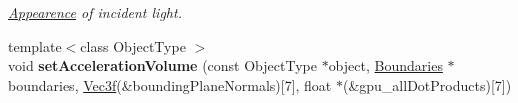 \begin{DoxyCompactItemize}
\begin{DoxyCompactList}\small\item\em \hyperlink{struct_appearence}{Appearence} of incident light. \end{DoxyCompactList}\item 
{\footnotesize template$<$class Object\+Type $>$ }\\void {\bfseries set\+Acceleration\+Volume} (const Object\+Type $\ast$object, \hyperlink{class_boundaries}{Boundaries} $\ast$boundaries, \hyperlink{class_vec3}{Vec3f}(\&bounding\+Plane\+Normals)\mbox{[}7\mbox{]}, float $\ast$(\&gpu\+\_\+all\+Dot\+Products)\mbox{[}7\mbox{]})\hypertarget{cuda_tracer__0__1_2source_2describers_8cu_af200001078985416703edd331d7cf722}{}\label{cuda_tracer__0__1_2source_2describers_8cu_af200001078985416703edd331d7cf722}


\end{DoxyCompactItemize}
